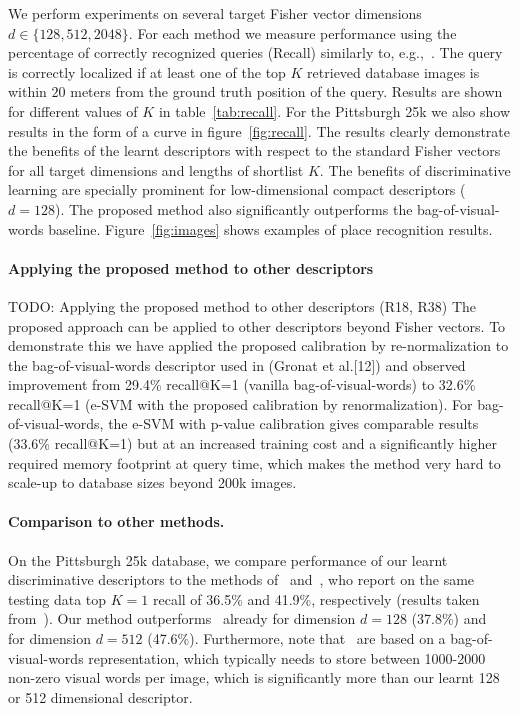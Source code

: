 \documentclass[10pt,twocolumn,letterpaper]{article}
\begin{document}
      We perform experiments on several target Fisher vector dimensions $d\in\{128,512,2048\}$. For each method we measure performance using the percentage of correctly recognized queries (Recall) similarly to, e.g.,~\cite{Chen11,Knopp2010,Sattler-BMVC12}. The query is correctly localized if at least one of the top $K$ retrieved database images is within $20$ meters from the ground truth position of the query. Results are shown for different values of $K$ in table~\ref{tab:recall}. For the Pittsburgh 25k we also show results in the form of a curve in figure~\ref{fig:recall}. The results clearly demonstrate the benefits of the learnt descriptors with respect to the standard Fisher vectors for all target dimensions and lengths of shortlist $K$. The benefits of discriminative learning are specially prominent for low-dimensional compact descriptors ($d=128$). 
      The proposed method also significantly outperforms the bag-of-visual-words baseline. Figure~\ref{fig:images} shows examples of place recognition results. 

      \paragraph{Applying the proposed method to other descriptors}
        \textcolor{petr}{TODO:  
          Applying the proposed method to other descriptors (R18, R38) The proposed approach can be applied to other descriptors beyond Fisher vectors. To demonstrate this we have applied the proposed calibration by re-normalization to the bag-of-visual-words descriptor used in (Gronat et al.[12]) and observed improvement from 29.4\% recall@K=1 (vanilla bag-of-visual-words) to 32.6\% recall@K=1 (e-SVM with the proposed calibration by renormalization). For bag-of-visual-words, the e-SVM with p-value calibration gives comparable results (33.6\% recall@K=1) but at an increased training cost and a significantly higher required memory footprint at query time, which makes the method very hard to scale-up to database sizes beyond 200k images.
        }

      \paragraph{Comparison to other methods.}
         On the Pittsburgh 25k database, we compare performance of our learnt discriminative descriptors to the methods of~\cite{Gronat13} and~\cite{Knopp2010}, who report on the same testing data top $K=1$ recall of 36.5\% and 41.9\%, respectively (results taken from~\cite{Gronat13}). Our method outperforms~\cite{Knopp2010} already for dimension $d=128$ (37.8\%) and~\cite{Gronat13} for dimension $d=512$ (47.6\%). Furthermore, note that~\cite{Gronat13,Knopp2010} are based on a bag-of-visual-words representation, which typically needs to store between 1000-2000 non-zero visual words per image, which is significantly more than our learnt 128 or 512 dimensional descriptor. 
\end{document}
